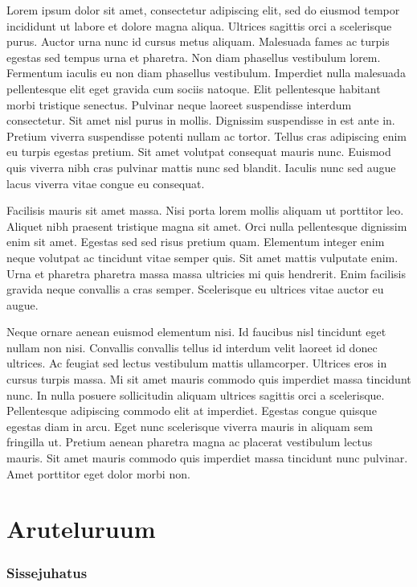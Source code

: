 \documentclass[]{book}
\begin{document}
Lorem ipsum dolor sit amet, consectetur adipiscing elit, sed do eiusmod tempor incididunt ut labore et dolore magna aliqua. Ultrices sagittis orci a scelerisque purus. Auctor urna nunc id cursus metus aliquam. Malesuada fames ac turpis egestas sed tempus urna et pharetra. Non diam phasellus vestibulum lorem. Fermentum iaculis eu non diam phasellus vestibulum. Imperdiet nulla malesuada pellentesque elit eget gravida cum sociis natoque. Elit pellentesque habitant morbi tristique senectus. Pulvinar neque laoreet suspendisse interdum consectetur. Sit amet nisl purus in mollis. Dignissim suspendisse in est ante in. Pretium viverra suspendisse potenti nullam ac tortor. Tellus cras adipiscing enim eu turpis egestas pretium. Sit amet volutpat consequat mauris nunc. Euismod quis viverra nibh cras pulvinar mattis nunc sed blandit. Iaculis nunc sed augue lacus viverra vitae congue eu consequat.

Facilisis mauris sit amet massa. Nisi porta lorem mollis aliquam ut porttitor leo. Aliquet nibh praesent tristique magna sit amet. Orci nulla pellentesque dignissim enim sit amet. Egestas sed sed risus pretium quam. Elementum integer enim neque volutpat ac tincidunt vitae semper quis. Sit amet mattis vulputate enim. Urna et pharetra pharetra massa massa ultricies mi quis hendrerit. Enim facilisis gravida neque convallis a cras semper. Scelerisque eu ultrices vitae auctor eu augue.

Neque ornare aenean euismod elementum nisi. Id faucibus nisl tincidunt eget nullam non nisi. Convallis convallis tellus id interdum velit laoreet id donec ultrices. Ac feugiat sed lectus vestibulum mattis ullamcorper. Ultrices eros in cursus turpis massa. Mi sit amet mauris commodo quis imperdiet massa tincidunt nunc. In nulla posuere sollicitudin aliquam ultrices sagittis orci a scelerisque. Pellentesque adipiscing commodo elit at imperdiet. Egestas congue quisque egestas diam in arcu. Eget nunc scelerisque viverra mauris in aliquam sem fringilla ut. Pretium aenean pharetra magna ac placerat vestibulum lectus mauris. Sit amet mauris commodo quis imperdiet massa tincidunt nunc pulvinar. Amet porttitor eget dolor morbi non.

\hypertarget{chapter10}{%
\chapter{Aruteluruum}\label{chapter10}}

\hypertarget{sissejuhatus}{%
\subsection*{Sissejuhatus}\label{sissejuhatus}}
\end{document}
